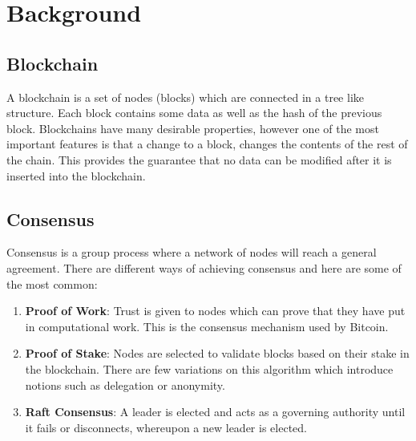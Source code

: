 \documentclass[12pt, letterpaper, twoside]{article}
\begin{document}
	
	\section*{Background}
	\subsection*{Blockchain}
	\noindent A blockchain is a set of nodes (blocks) which are connected in a tree like structure. Each block contains some data as well as the hash of the previous block. Blockchains have many desirable properties, however one of the most important features is that a change to a block, changes the contents of the rest of the chain. This provides the guarantee that no data can be modified after it is inserted into the blockchain.

	\subsection*{Consensus}
	\noindent Consensus is a group process where a network of nodes will reach a general agreement. There are different ways of achieving consensus and here are some of the most common:
	\begin{enumerate}

	\item \textbf{Proof of Work}: Trust is given to nodes which can prove that they have put in computational work. This is the consensus mechanism used by Bitcoin.
	\item \textbf{Proof of Stake}: Nodes are selected to validate blocks based on their stake in the blockchain. There are few variations on this algorithm which introduce notions such as delegation or anonymity.
	\item \textbf{Raft Consensus}: A leader is elected and acts as a governing authority until it fails or disconnects, whereupon a new leader is elected.
	\end{enumerate}
\end{document}
